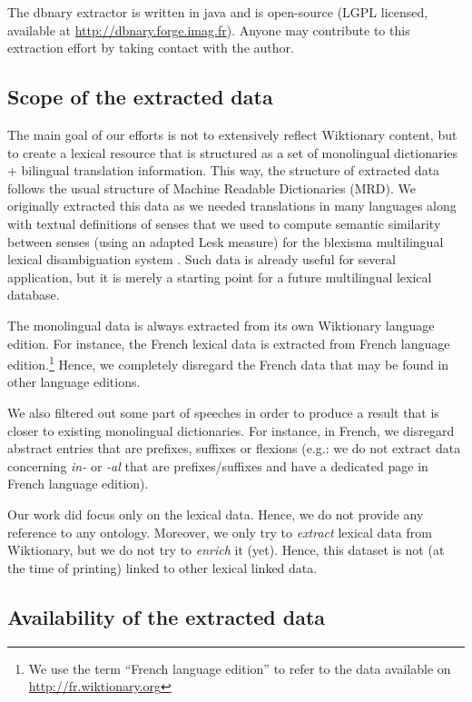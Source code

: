 \documentclass[sw]{iosart2c}
\begin{document}
The dbnary extractor is written in java and is open-source (LGPL licensed, available at \url{http://dbnary.forge.imag.fr}). Anyone may contribute to this extraction effort by taking contact with the author.

\subsection{Scope of the extracted data}

The main goal of our efforts is not to extensively reflect Wiktionary content, but to create a lexical resource that is structured as a set of monolingual dictionaries + bilingual translation information. This way, the structure of extracted data follows the usual structure of Machine Readable Dictionaries (MRD). We originally extracted this data as we needed translations in many languages along with textual definitions of senses that we used to compute semantic similarity between senses (using an adapted Lesk measure) for the blexisma multilingual lexical disambiguation system \cite{schwab2012coling}. Such data is already useful for several application, but it is merely a starting point for a future multilingual lexical database.

The monolingual data is always extracted from its own Wiktionary language edition. For instance, the French lexical data is extracted from French language edition.\footnote{We use the term ``French language edition'' to refer to the data available on \url{http://fr.wiktionary.org}} Hence, we completely disregard the French data that may be found in other language editions.

We also filtered out some part of speeches in order to produce a result that is closer to existing monolingual dictionaries. For instance, in French, we disregard abstract entries that are prefixes, suffixes or flexions (e.g.: we do not extract data concerning \textit{in-} or \textit{-al} that are prefixes/suffixes and have a dedicated page in French language edition). 

Our work did focus only on the lexical data. Hence, we do not provide any reference to any ontology. Moreover, we only try to \emph{extract} lexical data from Wiktionary, but we do not try to \emph{enrich} it (yet). Hence, this dataset is not (at the time of printing) linked to other lexical linked data.

\subsection{Availability of the extracted data}
\end{document}
